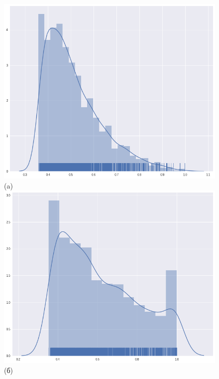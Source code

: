 \begin{figure}[t!]
	\centering	
	\includegraphics[width=0.95\linewidth]{Figures/Chapter4/train_dist_cancer.png}\\
	(a)
	\endminipage\hfill
	\centering	
	\includegraphics[width=0.95\linewidth]{Figures/Chapter4/train_dist_fibro.png}\\
	(б)
	\endminipage\hfill
	\\	
	\centering	

\end{figure}
